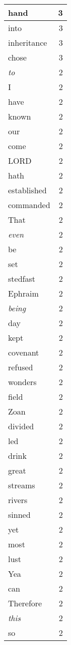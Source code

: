 \begin{center}
\begin{longtable}{l|r}
hand & 3\\ \hline 
into & 3\\ \hline 
inheritance & 3\\ \hline 
chose & 3\\ \hline 
\emph{to} & 2\\ \hline 
I & 2\\ \hline 
have & 2\\ \hline 
known & 2\\ \hline 
our & 2\\ \hline 
come & 2\\ \hline 
LORD & 2\\ \hline 
hath & 2\\ \hline 
established & 2\\ \hline 
commanded & 2\\ \hline 
That & 2\\ \hline 
\emph{even} & 2\\ \hline 
be & 2\\ \hline 
set & 2\\ \hline 
stedfast & 2\\ \hline 
Ephraim & 2\\ \hline 
\emph{being} & 2\\ \hline 
day & 2\\ \hline 
kept & 2\\ \hline 
covenant & 2\\ \hline 
refused & 2\\ \hline 
wonders & 2\\ \hline 
field & 2\\ \hline 
Zoan & 2\\ \hline 
divided & 2\\ \hline 
led & 2\\ \hline 
drink & 2\\ \hline 
great & 2\\ \hline 
streams & 2\\ \hline 
rivers & 2\\ \hline 
sinned & 2\\ \hline 
yet & 2\\ \hline 
most & 2\\ \hline 
lust & 2\\ \hline 
Yea & 2\\ \hline 
can & 2\\ \hline 
Therefore & 2\\ \hline 
\emph{this} & 2\\ \hline 
so & 2\\ \hline 

\end{longtable}
\end{center}
